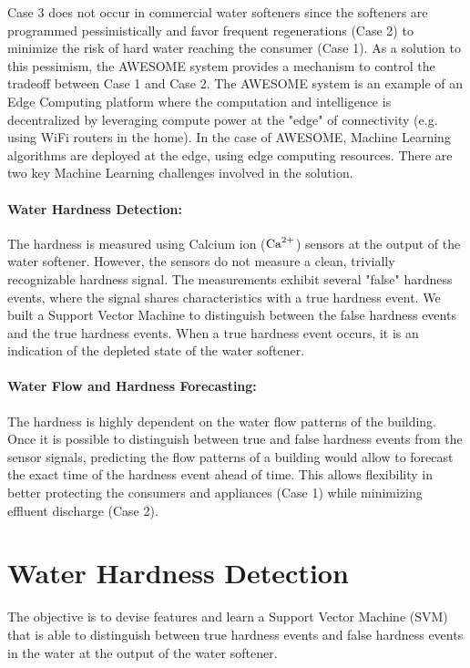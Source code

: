 Case 3 does not occur in commercial water softeners since the softeners are programmed pessimistically and favor frequent regenerations (Case 2) to minimize the risk of hard water reaching the consumer (Case 1).
 As a solution to this pessimism, the AWESOME system \cite{AWESOME} provides a mechanism to control the tradeoff between Case 1 and Case 2.
 The AWESOME \cite{AWESOME} system is an example of an Edge Computing platform where the computation and intelligence is decentralized by leveraging compute power at the "edge" of connectivity (e.g. using WiFi routers in the home).
 In the case of AWESOME, Machine Learning algorithms are deployed at the edge, using edge computing resources.
 There are two key Machine Learning challenges involved in the solution.

\paragraph{Water Hardness Detection:} The hardness is measured using Calcium ion ($\text{Ca}^{2+}$) sensors at the output of the water softener.
 However, the sensors do not measure a clean, trivially recognizable hardness signal.
 The measurements exhibit several "false" hardness events, where the signal shares characteristics with a true hardness event.
 We built a Support Vector Machine to distinguish between the false hardness events and the true hardness events.
 When a true hardness event occurs, it is an indication of the depleted state of the water softener.

\paragraph{Water Flow and Hardness Forecasting:} The hardness is highly dependent on the water flow patterns of the building.
 Once it is possible to distinguish between true and false hardness events from the sensor signals, predicting the flow patterns of a building would allow to forecast the exact time of the hardness event ahead of time.
 This allows flexibility in better protecting the consumers and appliances (Case 1) while minimizing effluent discharge (Case 2).





\section{Water Hardness Detection}

The objective is to devise features and learn a Support Vector Machine (SVM) that is able to distinguish between true hardness events and false hardness events in the water at the output of the water softener.



